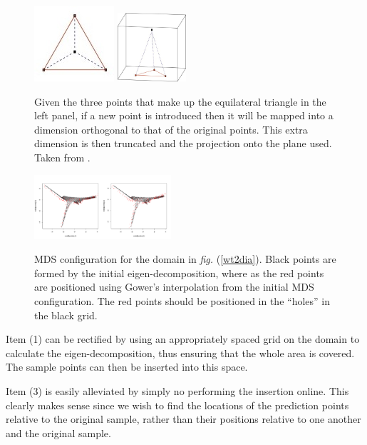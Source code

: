 \documentclass[a4paper,10pt]{amsart}
\newcommand{\fig}[1]{\emph{fig.} (\ref{#1})}
\begin{document}
\begin{figure}
\centering
\includegraphics{figs/boj0.jpg} \includegraphics[width=1in]{figs/boj1.jpg} \\
\caption{Given the three points that make up the equilateral triangle in the left panel, if a new point is introduced then it will be mapped into a dimension orthogonal to that of the original points. This extra dimension is then truncated and the projection onto the plane used. Taken from \cite{Boj2009}.}
\label{bojinsert}
\end{figure}

\begin{figure}
\centering
\includegraphics[width=2in]{figs/gowererror.pdf} \\
\caption{MDS configuration for the domain in \fig{wt2dia}. Black points are formed by the initial eigen-decomposition, where as the red points are positioned using Gower's interpolation from the initial MDS configuration. The red points should be positioned in the ``holes'' in the black grid.}
\label{gowererror}
\end{figure}

Item (1) can be rectified by using an appropriately spaced grid on the domain to calculate the eigen-decomposition, thus ensuring that the whole area is covered. The sample points can then be inserted into this space.

Item (3) is easily alleviated by simply no performing the insertion online. This clearly makes sense since we wish to find the locations of the prediction points relative to the original sample, rather than their positions relative to one another and the original sample.
\end{document}
